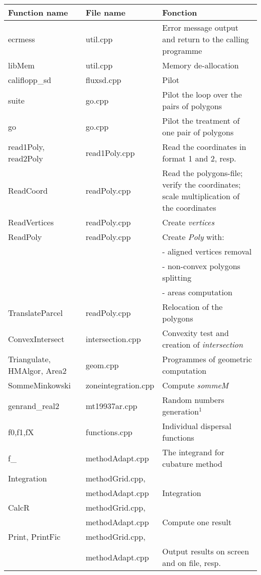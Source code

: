 \footnotesize
\begin{tabular}{|p{2.5cm}|p{3.5cm}|p{7cm}|} \hline
 \hline
{\bf Function name} & {\bf File name} & {\bf
  Fonction} \\ \hline
ecrmess & util.cpp & Error message output and return to the calling
programme \\ \hline
libMem & util.cpp & Memory de-allocation \\ \hline
califlopp\_sd & fluxsd.cpp & Pilot \\ \hline
suite & go.cpp & Pilot the loop over the pairs of polygons \\ \hline
go & go.cpp & Pilot the treatment of one pair of polygons \\ \hline
\hline
read1Poly, read2Poly & read1Poly.cpp & Read the coordinates in format
1 and 2, resp. \\ \hline
ReadCoord  & readPoly.cpp & Read the polygons-file; verify the coordinates; scale
multiplication of the coordinates\\ \hline
ReadVertices & readPoly.cpp & Create {\em vertices}  \\ \hline
ReadPoly  & readPoly.cpp &  Create {\em Poly} with: \\
& & - aligned vertices removal  \\
& & - non-convex polygons splitting  \\ 
& & - areas computation \\ \hline
TranslateParcel & readPoly.cpp & Relocation of the polygons \\ \hline
\hline
ConvexIntersect & intersection.cpp & Convexity test and creation of
{\em intersection}  \\ \hline
Triangulate, HMAlgor, Area2 & geom.cpp &  Programmes of geometric
computation \\ \hline
SommeMinkowski & zoneintegration.cpp & Compute {\em sommeM}  \\
\hline
genrand\_real2 &mt19937ar.cpp & Random numbers generation$^1$ \\
 \hline
f0,f1,fX & functions.cpp & Individual dispersal functions \\ \hline
f\_ &  methodAdapt.cpp & The integrand for cubature method \\ \hline
Integration & methodGrid.cpp, &\\
& methodAdapt.cpp & Integration  \\ \hline
CalcR  & methodGrid.cpp, &\\
& methodAdapt.cpp & Compute one result   \\ \hline
Print, PrintFic & methodGrid.cpp, &\\
& methodAdapt.cpp & Output results on
screen and on file, resp.  \\ \hline
\hline
\end{tabular}
\normalsize
